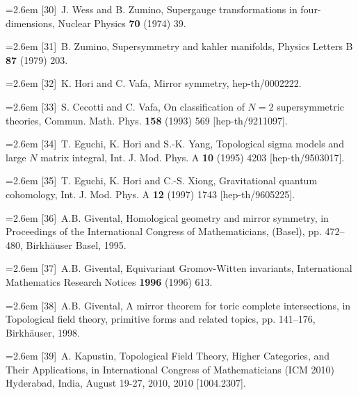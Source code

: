 \par\noindent\hangindent=2.6em [30]~J. Wess and B. Zumino, Supergauge transformations in four-dimensions, Nuclear Physics \textbf{70} (1974) 39.

\par\noindent\hangindent=2.6em [31]~B. Zumino, Supersymmetry and kahler manifolds, Physics Letters B \textbf{87} (1979) 203.

\par\noindent\hangindent=2.6em [32]~K. Hori and C. Vafa, Mirror symmetry, hep-th/0002222.

\par\noindent\hangindent=2.6em [33]~S. Cecotti and C. Vafa, On classification of $N=2$ supersymmetric theories, Commun. Math. Phys. \textbf{158} (1993) 569 [hep-th/9211097].

\par\noindent\hangindent=2.6em [34]~T. Eguchi, K. Hori and S.-K. Yang, Topological sigma models and large $N$ matrix integral, Int. J. Mod. Phys. A \textbf{10} (1995) 4203 [hep-th/9503017].

\par\noindent\hangindent=2.6em [35]~T. Eguchi, K. Hori and C.-S. Xiong, Gravitational quantum cohomology, Int. J. Mod. Phys. A \textbf{12} (1997) 1743 [hep-th/9605225].


\par\noindent\hangindent=2.6em [36]~A.B. Givental, Homological geometry and mirror symmetry, in Proceedings of the International Congress of Mathematicians, (Basel), pp. 472--480, Birkhäuser Basel, 1995.

\par\noindent\hangindent=2.6em [37]~A.B. Givental, Equivariant Gromov-Witten invariants, International Mathematics Research Notices \textbf{1996} (1996) 613.

\par\noindent\hangindent=2.6em [38]~A.B. Givental, A mirror theorem for toric complete intersections, in Topological field theory, primitive forms and related topics, pp. 141--176, Birkhäuser, 1998.

\par\noindent\hangindent=2.6em [39]~A. Kapustin, Topological Field Theory, Higher Categories, and Their Applications, in International Congress of Mathematicians (ICM 2010) Hyderabad, India, August 19-27, 2010, 2010 [1004.2307].

